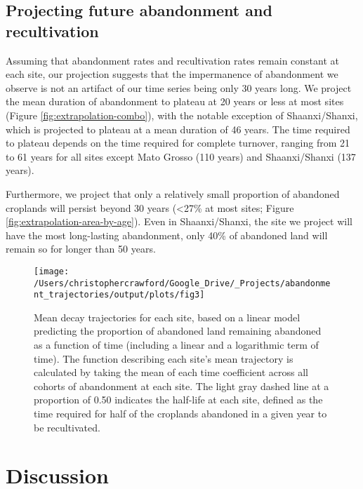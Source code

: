 \documentclass[9pt,twocolumn,twoside,lineno]{pnas-new}
\begin{document}
\hypertarget{projecting-future-abandonment-and-recultivation}{%
\subsection*{Projecting future abandonment and recultivation}\label{projecting-future-abandonment-and-recultivation}}

Assuming that abandonment rates and recultivation rates remain constant at each site, our projection suggests that the impermanence of abandonment we observe is not an artifact of our time series being only 30 years long.
We project the mean duration of abandonment to plateau at 20 years or less at most sites (Figure \ref{fig:extrapolation-combo}), with the notable exception of Shaanxi/Shanxi, which is projected to plateau at a mean duration of 46 years.
The time required to plateau depends on the time required for complete turnover, ranging from 21 to 61 years for all sites except Mato Grosso (110 years) and Shaanxi/Shanxi (137 years).

Furthermore, we project that only a relatively small proportion of abandoned croplands will persist beyond 30 years (\textless27\% at most sites; Figure \ref{fig:extrapolation-area-by-age}).
Even in Shaanxi/Shanxi, the site we project will have the most long-lasting abandonment, only 40\% of abandoned land will remain so for longer than 50 years.



\begin{figure*}
\texttt{[image: /Users/christophercrawford/Google\_Drive/\_Projects/abandonment\_trajectories/output/plots/fig3]} \caption{Mean decay trajectories for each site, based on a linear model predicting the proportion of abandoned land remaining abandoned as a function of time (including a linear and a logarithmic term of time). The function describing each site's mean trajectory is calculated by taking the mean of each time coefficient across all cohorts of abandonment at each site. The light gray dashed line at a proportion of 0.50 indicates the half-life at each site, defined as the time required for half of the croplands abandoned in a given year to be recultivated.}\label{fig:decay-curves-by-site}
\end{figure*}

\hypertarget{discussion}{%
\section*{Discussion}\label{discussion}}
\end{document}
